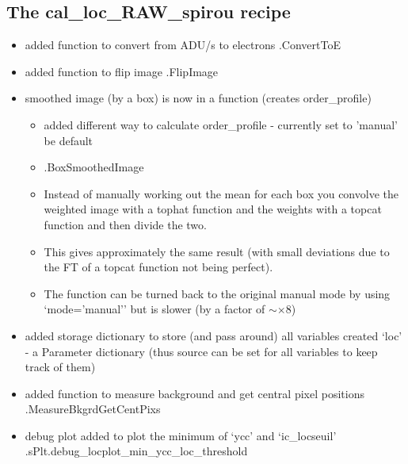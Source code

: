 \subsection{The cal\_loc\_RAW\_spirou recipe}
\label{ch:changelog:At4:cal_loc_RAW_spirou}

\begin{itemize}

\item added function to convert from ADU/s to electrons \spirouImage.ConvertToE
    
\item added function to flip image \spirouImage.FlipImage

\item smoothed image (by a box) is now in a function (creates order\_profile)
	\begin{itemize}
	\item added different way to calculate order\_profile - currently set to 'manual' be default
	\item \spirouLOCOR.BoxSmoothedImage 
	\item Instead of manually working out the mean for each box you convolve the weighted image with a tophat function and the weights with a topcat function and then divide the two.
	\item This gives approximately the same result (with small deviations due to the FT of a topcat function not being perfect).
	\item The function can be turned back to the original manual mode by using `mode='manual'' but is slower (by a factor of $\sim\times$8)
	\end{itemize}

\item added storage dictionary to store (and pass around) all variables created `loc' - a Parameter dictionary (thus source can be set for all variables to keep track of them)

\item added function to measure background and get central pixel positions \spirouLOCOR.MeasureBkgrdGetCentPixs

\item debug plot added to plot the minimum of `ycc' and `ic\_locseuil' \spirouPlot.sPlt.debug\_locplot\_min\_ycc\_loc\_threshold


\end{itemize}
